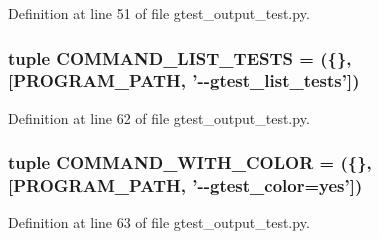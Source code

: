 \-Definition at line 51 of file gtest\-\_\-output\-\_\-test.\-py.

\hypertarget{namespacegtest__output__test_aa70dd51efa7d58dfb1b670c3218127ba}{
\subsubsection[{\-C\-O\-M\-M\-A\-N\-D\-\_\-\-L\-I\-S\-T\-\_\-\-T\-E\-S\-T\-S}]{\setlength{\rightskip}{0pt plus 5cm}tuple {\bf \-C\-O\-M\-M\-A\-N\-D\-\_\-\-L\-I\-S\-T\-\_\-\-T\-E\-S\-T\-S} = (\{\}, \mbox{[}{\bf \-P\-R\-O\-G\-R\-A\-M\-\_\-\-P\-A\-T\-H}, '-\/-\/gtest\-\_\-list\-\_\-tests'\mbox{]})}}\label{d6/dc2/namespacegtest__output__test_aa70dd51efa7d58dfb1b670c3218127ba}


\-Definition at line 62 of file gtest\-\_\-output\-\_\-test.\-py.

\hypertarget{namespacegtest__output__test_a7a51a12358371da1a3070c78d16f6427}{
\subsubsection[{\-C\-O\-M\-M\-A\-N\-D\-\_\-\-W\-I\-T\-H\-\_\-\-C\-O\-L\-O\-R}]{\setlength{\rightskip}{0pt plus 5cm}tuple {\bf \-C\-O\-M\-M\-A\-N\-D\-\_\-\-W\-I\-T\-H\-\_\-\-C\-O\-L\-O\-R} = (\{\}, \mbox{[}{\bf \-P\-R\-O\-G\-R\-A\-M\-\_\-\-P\-A\-T\-H}, '-\/-\/gtest\-\_\-color=yes'\mbox{]})}}\label{d6/dc2/namespacegtest__output__test_a7a51a12358371da1a3070c78d16f6427}


\-Definition at line 63 of file gtest\-\_\-output\-\_\-test.\-py.

